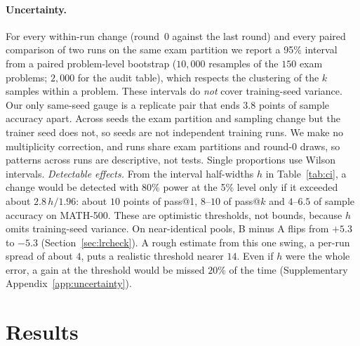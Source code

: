 \documentclass[runningheads]{llncs}
\begin{document}
\paragraph{Uncertainty.} For every within-run change (round~0 against the last
round) and every paired comparison of two runs on the same exam partition we
report a 95\% interval from a paired problem-level bootstrap ($10{,}000$
resamples of the $150$ exam problems; $2{,}000$ for the audit table), which respects the clustering of the $k$
samples within a problem. These intervals do \emph{not} cover training-seed
variance. Our only same-seed gauge is a replicate pair that ends $3.8$ points of
sample accuracy apart. Across seeds the exam partition and sampling change but
the trainer seed does not, so seeds are not independent training runs. We make
no multiplicity correction, and runs share exam partitions and round-0 draws, so
patterns across runs are descriptive, not tests. Single proportions use Wilson
intervals. \emph{Detectable effects.} From the interval half-widths $h$ in
Table~\ref{tab:ci}, a change would be detected with $80\%$ power at the 5\%
level only if it exceeded about $2.8\,h/1.96$: about $10$ points of pass@1,
$8$--$10$ of pass@$k$ and $4$--$6.5$ of sample accuracy on MATH-500. These are
optimistic thresholds, not bounds, because $h$ omits training-seed variance. On
near-identical pools, B minus A flips from $+5.3$ to $-5.3$
(Section~\ref{sec:lrcheck}). A rough estimate from this one swing, a per-run
spread of about $4$, puts a realistic threshold nearer $14$. Even if $h$ were the
whole error, a gain at the threshold would be missed $20\%$ of the time
(Supplementary Appendix~\ref{app:uncertainty}).

\section{Results}
\label{sec:results}
\end{document}
